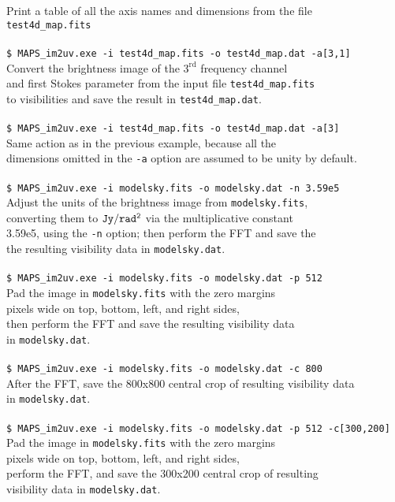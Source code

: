 \documentclass[letterpaper, twoside, 12pt]{article}
\begin{document}
\begin{tabbing}
   \> Print a table of all the axis names and dimensions from the file \\ 
{\tt test4d\_map.fits} \\
\\
{\tt \$ MAPS\_im2uv.exe -i test4d\_map.fits -o test4d\_map.dat -a[3,1]}\\ 
   \> Convert the brightness image of the $3^{\mathrm{rd}}$ frequency channel \\
   \> and first Stokes parameter from the input file {\tt test4d\_map.fits} \\
   \> to visibilities and save the result in {\tt test4d\_map.dat}.\\
\\
{\tt \$ MAPS\_im2uv.exe -i test4d\_map.fits -o test4d\_map.dat -a[3]}\\ 
   \> Same action as in the previous example, because all the \\ \> dimensions omitted in the {\tt -a} option are assumed to be unity by default.\\
\\
{\tt \$ MAPS\_im2uv.exe -i modelsky.fits -o modelsky.dat -n 3.59e5}\\ 
\> Adjust the units of the brightness image from {\tt modelsky.fits}, \\
\> converting them to ${\tt Jy/rad^2}$ via the multiplicative constant \\ 
\> 3.59e5, using the {\tt -n} option; then perform the FFT and save the \\
\> the resulting visibility data in {\tt modelsky.dat}. \\
\\
{\tt \$ MAPS\_im2uv.exe -i modelsky.fits -o modelsky.dat -p 512} \\
\> Pad the image in {\tt modelsky.fits} with the zero margins \\
 pixels wide on top, bottom, left, and right sides, \\
\> then perform the FFT and save the resulting visibility data \\
\> in {\tt modelsky.dat}.\\
\\
{\tt \$ MAPS\_im2uv.exe -i modelsky.fits -o modelsky.dat -c 800} \\
\> After the FFT, save the 800x800 central crop of resulting visibility data \\
\> in {\tt modelsky.dat}.\\
\\
{\tt \$ MAPS\_im2uv.exe -i modelsky.fits -o modelsky.dat -p 512 -c[300,200]} \\
\> Pad the image in {\tt modelsky.fits} with the zero margins \\
 pixels wide on top, bottom, left, and right sides, \\
\> perform the FFT, and  save the 300x200 central crop of resulting \\
\> visibility data in {\tt modelsky.dat}.\\



\end{tabbing}
\end{document}
